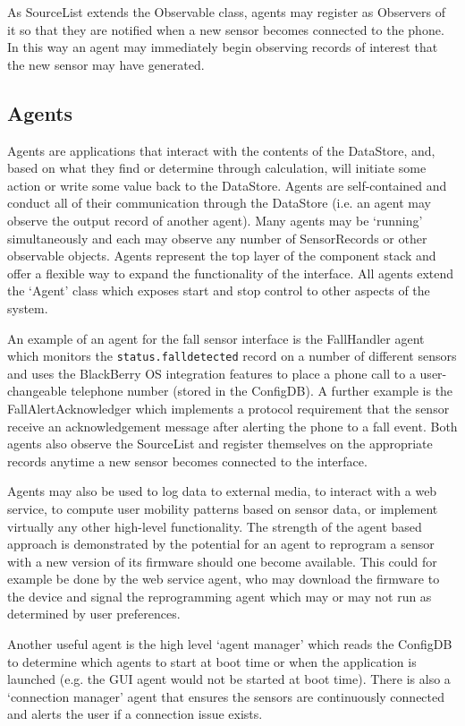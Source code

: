 \documentclass[conference,a4paper]{IEEEtran}
\begin{document}
As SourceList extends the Observable class, agents may register as Observers of it so that they are notified when a new sensor becomes connected to the phone. In this way an agent may immediately begin observing records of interest that the new sensor may have generated. 

\subsection{Agents}
Agents are applications that interact with the contents of the DataStore, and, based on what they find or determine through calculation, will initiate some action or write some value back to the DataStore. Agents are self-contained and conduct all of their communication through the DataStore (i.e. an agent may observe the output record of another agent). Many agents may be `running' simultaneously and each may observe any number of SensorRecords or other observable objects. Agents represent the top layer of the component stack and offer a flexible way to expand the functionality of the interface. All agents extend the `Agent' class which exposes start and stop control to other aspects of the system. 

An example of an agent for the fall sensor interface is the FallHandler agent which monitors the \verb#status.falldetected# record on a number of different sensors and uses the BlackBerry OS integration features to place a phone call to a user-changeable telephone number (stored in the ConfigDB). A further example is the  FallAlertAcknowledger which implements a protocol requirement that the sensor receive an acknowledgement message after alerting the phone to a fall event. Both agents also observe the SourceList and register themselves on the appropriate records anytime a new sensor becomes connected to the interface.

Agents may also be used to log data to external media, to interact with a web service, to compute user mobility patterns based on sensor data, or implement virtually any other high-level functionality. The strength of the agent based approach is demonstrated by the potential for an agent to reprogram a sensor with a new version of its firmware should one become available. This could for example be done by the web service agent, who may download the firmware to the device and signal the reprogramming agent which may or may not run as determined by user preferences.

Another useful agent is the high level `agent manager' which reads the ConfigDB to determine which agents to start at boot time or when the application is launched (e.g. the GUI agent would not be started at boot time). There is also a `connection manager' agent that ensures the sensors are continuously connected and alerts the user if a connection issue exists.
\end{document}
